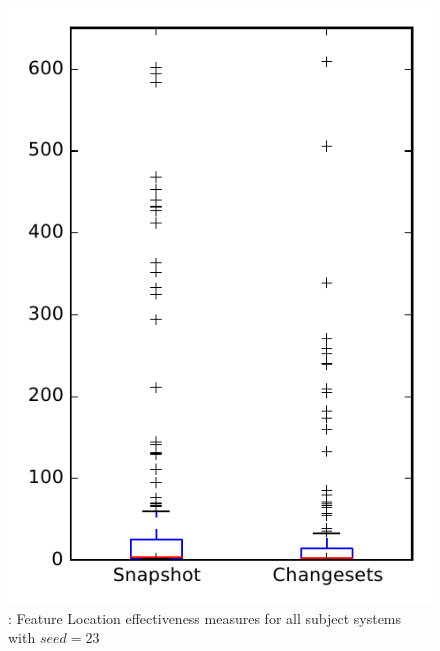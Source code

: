
\begin{figure}
\centering
\includegraphics[height=0.4\textheight]{figures/flt_seed/rq1_overview_23}
\caption{\rone: Feature Location effectiveness measures for all subject systems with $seed=23$}
\label{fig:flt_seed:rq1:overview}
\end{figure}
